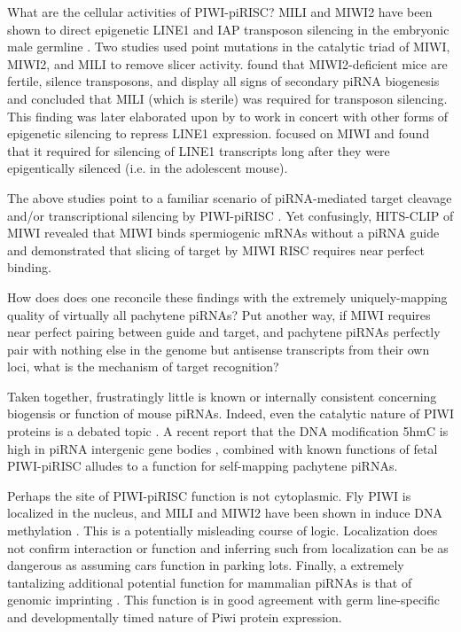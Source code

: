     What are the cellular activities of PIWI-piRISC? MILI and MIWI2 have been shown to direct epigenetic LINE1 and IAP transposon silencing in the embryonic male germline \citep{Aravin2007,Carmell2007,Kuramochi2008}. Two studies \citep{DeFazio2011,Reuter2011} used point mutations in the catalytic triad of MIWI, MIWI2, and MILI to remove slicer activity. \citet{DeFazio2011} found that MIWI2-deficient mice are fertile, silence transposons, and display all signs of secondary piRNA biogenesis and concluded that MILI (which is sterile) was required for transposon silencing. This finding was later elaborated upon by \citet{DiGiacomo2013} to work in concert with other forms of epigenetic silencing to repress LINE1 expression. \citet{Reuter2011} focused on MIWI and found that it required for silencing of LINE1 transcripts long after they were epigentically silenced (i.e. in the adolescent mouse).

    The above studies point to a familiar scenario of piRNA-mediated target cleavage and/or transcriptional silencing by PIWI-piRISC \citep{Meister2013}. Yet confusingly, HITS-CLIP of MIWI revealed that MIWI binds spermiogenic mRNAs without a piRNA guide \citep{Vourekas2012} and \citet{Reuter2011} demonstrated that slicing of target by MIWI RISC requires near perfect binding.

    How does does one reconcile these findings with the extremely uniquely-mapping quality of virtually all pachytene piRNAs? Put another way, if MIWI requires near perfect pairing between guide and target, and pachytene piRNAs perfectly pair with nothing else in the genome but antisense transcripts from their own loci, what is the mechanism of target recognition?

    Taken together, frustratingly little is known or internally consistent concerning biogensis or function of mouse piRNAs. Indeed, even the catalytic nature of PIWI proteins is a debated topic \citep{Luteijn2013,Meister2013}. A recent report that the DNA modification 5hmC is high in piRNA intergenic gene bodies \citep{Gan2013}, combined with known functions of fetal PIWI-piRISC alludes to a function for self-mapping pachytene piRNAs.

    Perhaps the site of PIWI-piRISC function is not cytoplasmic. Fly PIWI is localized in the nucleus, and MILI and MIWI2 have been shown in induce DNA methylation \citep{Cox2000,Aravin2008}. This is a potentially misleading course of logic. Localization does not confirm interaction \citep{North2006} or function and inferring such from localization can be as dangerous as assuming cars function in parking lots. Finally, a extremely tantalizing additional potential function for mammalian piRNAs is that of genomic imprinting \citep{Watanabe2011}. This function is in good agreement with germ line-specific and developmentally timed nature of Piwi protein expression.

